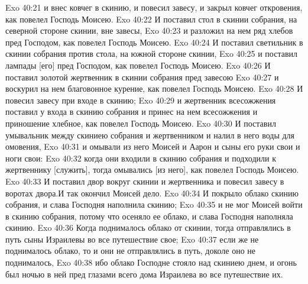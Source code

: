\vs Exo 40:21 и внес ковчег в скинию, и повесил завесу, и закрыл ковчег откровения, как повелел Господь Моисею.
\vs Exo 40:22 И поставил стол в скинии собрания, на северной стороне скинии, вне завесы,
\vs Exo 40:23 и разложил на нем ряд хлебов пред Господом, как повелел Господь Моисею.
\vs Exo 40:24 И поставил светильник в скинии собрания против стола, на южной стороне скинии,
\vs Exo 40:25 и поставил лампады [его] пред Господом, как повелел Господь Моисею.
\vs Exo 40:26 И поставил золотой жертвенник в скинии собрания пред завесою
\vs Exo 40:27 и воскурил на нем благовонное курение, как повелел Господь Моисею.
\vs Exo 40:28 И повесил завесу при входе в скинию;
\vs Exo 40:29 и жертвенник всесожжения поставил у входа в скинию собрания и принес на нем всесожжения и приношение хлебное, как повелел Господь Моисею.
\vs Exo 40:30 И поставил умывальник между скиниею собрания и жертвенником и налил в него воды для омовения,
\vs Exo 40:31 и омывали из него Моисей и Аарон и сыны его руки свои и ноги свои:
\vs Exo 40:32 когда они входили в скинию собрания и подходили к жертвеннику [служить], тогда омывались [из него], как повелел Господь Моисею.
\vs Exo 40:33 И поставил двор вокруг скинии и жертвенника и повесил завесу в воротах двора.\rsbpar И так окончил Моисей дело.
\vs Exo 40:34 И покрыло облако скинию собрания, и слава Господня наполнила скинию;
\vs Exo 40:35 и не мог Моисей войти в скинию собрания, потому что осеняло ее облако, и слава Господня наполняла скинию.
\vs Exo 40:36 Когда поднималось облако от скинии, тогда отправлялись в путь сыны Израилевы во все путешествие свое;
\vs Exo 40:37 если же не поднималось облако, то и они не отправлялись в путь, доколе оно не поднималось,
\vs Exo 40:38 ибо облако Господне стояло над скиниею днем, и огонь был ночью в ней пред глазами всего дома Израилева во все путешествие их.

